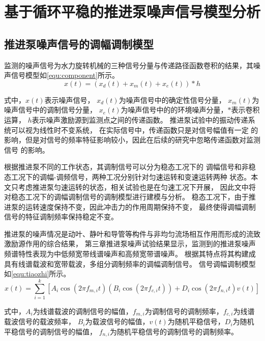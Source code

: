 \section{基于循环平稳的推进泵噪声信号模型分析}
\subsection{推进泵噪声信号的调幅调制模型}
监测的噪声信号为水力旋转机械的三种信号分量与传递路径函数卷积的结果，其噪声信号模型如\autoref{equ:component}所示。 
\begin{equation}
    \label{equ:component}
    x\left ( t \right ) =\left ( x_d\left ( t \right )+x_m\left ( t \right )+x_e\left ( t \right ) \right )\ast h 
\end{equation}

式中，$x\left ( t \right )$表示噪声信号，
$x_d\left ( t \right )$为噪声信号中的确定性信号分量，
$x_m\left ( t \right )$为噪声信号中的调制信号分量，
$x_e\left ( t \right )$为噪声信号中的的环境噪声分量，$\ast$表示卷积运算，
$h$表示噪声激励源到监测点之间的传递函数。 
推进泵试验中的振动传递系统可以视为线性时不变系统，
在实际信号中，传递函数只是对信号幅值有一定
的影响，但是对信号的频率特征影响较小，因此在后续的研究中忽略传递函数对监测信号
的影响。 

根据推进泵不同的工作状态，其调制信号可以分为稳态工况下的
调幅信号和非稳态工况下的调幅-调频信号，两种工况分别针对匀速运转和变速运转两种
状态。本文只考虑推进泵匀速运转的状态，相关试验也是在匀速工况下开展，
因此文中将对稳态工况下的调幅调制信号的调制模型进行建模与分析。 
稳态工况下，由于推进泵的运转速度保持不变，因此冲击力的作用周期保持不变，
最终使得调幅调制信号的特征调制频率保持稳定不变。

推进泵的噪声情况是动叶、静叶和导管等构件与非均匀流场相互作用而形成的流致激励源作用的综合结果，
第三章推进泵噪声试验结果显示，监测到的推进泵噪声频谱特性表现为中低频宽带线谱噪声和高频宽带谱噪声。
根据其特点将其构建成具有线谱载波和宽带载波，多组分调制频率的调幅调制信号\cite{Tarkan2013PREDICTION}。
信号调幅调制模型如\autoref{equ:tiaozhi}所示。
\begin{equation}
    \label{equ:tiaozhi}
    x\left ( t \right ) =\sum_{i=1}^{k}\left [ A_{i}\cos \left ( 2\pi f_{m,i}t  \right )\left ( B_{i}\cos\left ( 2\pi f_{c,i}t  \right )   \right )+D_{i}\cos\left ( 2\pi f_{n,i}t  \right )v\left ( t \right )      \right ]  
\end{equation}

式中，$A_i$为线谱载波的调制信号的幅值，$f_{m,i}$为调制信号的调制频率，$f_{c,i}$为线谱载波信号的载波频率，
$B_i$为载波信号的幅值，$v\left ( t \right )$为随机平稳信号，$D_i$为随机平稳信号的调制信号的幅值，
$f_{n,i}$为随机平稳信号的调制信号的调制频率。

